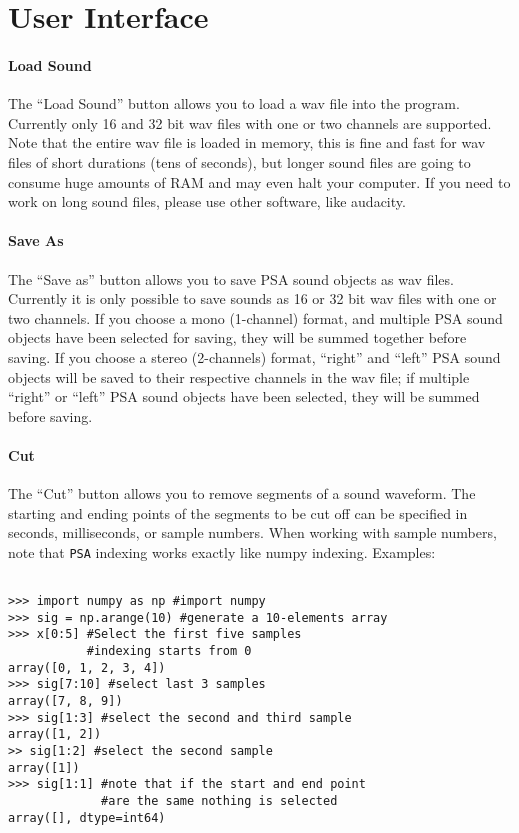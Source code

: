 \chapter{User Interface}

\subsubsection{Load Sound}
The ``Load Sound'' button allows you to load a wav file into the program. Currently only 16 and 32 bit wav files with one or two channels are supported. Note that the entire wav file is loaded in memory, this is fine and fast for wav files of short durations (tens of seconds), but longer sound files are going to consume huge amounts of RAM and may even halt your computer. If you need to work on long sound files, please use other software, like audacity.  

\subsubsection{Save As}
The ``Save as'' button allows you to save PSA sound objects as wav files. Currently it is only possible to save sounds as 16 or 32 bit wav files with one or two channels. If you choose a mono (1-channel) format, and multiple PSA sound objects have been selected for saving, they will be summed together before saving. If you choose a stereo (2-channels) format, ``right'' and ``left'' PSA sound objects will be saved to their respective channels in the wav file; if multiple ``right'' or ``left'' PSA sound objects have been selected, they will be summed before saving.

\subsubsection{Cut}
The ``Cut'' button allows you to remove segments of a sound waveform. The starting and ending points of the segments to be cut off can be specified in seconds, milliseconds, or sample numbers. When working with sample numbers, note that \texttt{PSA} indexing works exactly like numpy indexing. Examples:
\begin{verbatim}

>>> import numpy as np #import numpy
>>> sig = np.arange(10) #generate a 10-elements array
>>> x[0:5] #Select the first five samples
           #indexing starts from 0
array([0, 1, 2, 3, 4])
>>> sig[7:10] #select last 3 samples
array([7, 8, 9])
>>> sig[1:3] #select the second and third sample
array([1, 2])
>> sig[1:2] #select the second sample
array([1])
>>> sig[1:1] #note that if the start and end point
             #are the same nothing is selected
array([], dtype=int64)



\end{verbatim}


